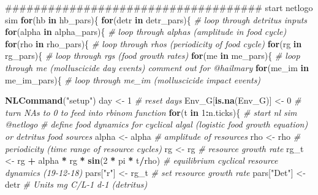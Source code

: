 \documentclass[10,portrait]{article}
\newenvironment{Shaded}{\begin{snugshade}}{\end{snugshade}}
\newcommand{\KeywordTok}[1]{\textcolor[rgb]{0.13,0.29,0.53}{\textbf{#1}}}
\newcommand{\DecValTok}[1]{\textcolor[rgb]{0.00,0.00,0.81}{#1}}
\newcommand{\StringTok}[1]{\textcolor[rgb]{0.31,0.60,0.02}{#1}}
\newcommand{\CommentTok}[1]{\textcolor[rgb]{0.56,0.35,0.01}{\textit{#1}}}
\newcommand{\ControlFlowTok}[1]{\textcolor[rgb]{0.13,0.29,0.53}{\textbf{#1}}}
\newcommand{\OperatorTok}[1]{\textcolor[rgb]{0.81,0.36,0.00}{\textbf{#1}}}
\newcommand{\NormalTok}[1]{#1}
\begin{document}
\begin{Shaded}
\begin{Highlighting}[]
{{{        
\NormalTok{####################################  start netlogo sim  }
        \ControlFlowTok{for}\NormalTok{(hb }\ControlFlowTok{in}\NormalTok{ hb_pars)\{}
          \ControlFlowTok{for}\NormalTok{(detr }\ControlFlowTok{in}\NormalTok{ detr_pars)\{ }\CommentTok{# loop through detritus inputs}
            \ControlFlowTok{for}\NormalTok{(alpha }\ControlFlowTok{in}\NormalTok{ alpha_pars)\{ }\CommentTok{# loop through alphas (amplitude in food cycle)}
              \ControlFlowTok{for}\NormalTok{(rho }\ControlFlowTok{in}\NormalTok{ rho_pars)\{ }\CommentTok{# loop through rhos (periodicity of food cycle)}
                \ControlFlowTok{for}\NormalTok{(rg }\ControlFlowTok{in}\NormalTok{ rg_pars)\{ }\CommentTok{# loop through rgs (food growth rates)}
                  \ControlFlowTok{for}\NormalTok{(me }\ControlFlowTok{in}\NormalTok{ me_pars)\{ }\CommentTok{# loop through me (molluscicide day events) comment out for @hailmary}
                  \ControlFlowTok{for}\NormalTok{(me_im }\ControlFlowTok{in}\NormalTok{ me_im_pars)\{ }\CommentTok{# loop through me_im (molluscicide impact events)}
                    
                    \KeywordTok{NLCommand}\NormalTok{(}\StringTok{"setup"}\NormalTok{)}
\NormalTok{                    day <-}\StringTok{ }\DecValTok{1} \CommentTok{# reset days }
\NormalTok{                    Env_G[}\KeywordTok{is.na}\NormalTok{(Env_G)] <-}\StringTok{ }\DecValTok{0} \CommentTok{# turn NAs to 0 to feed into rbinom function }
                    \ControlFlowTok{for}\NormalTok{(t }\ControlFlowTok{in} \DecValTok{1}\OperatorTok{:}\NormalTok{n.ticks)\{ }\CommentTok{# start nl sim  @netlogo}
                      \CommentTok{# define food dynamics for cyclical algal (logistic food growth equation) or detritus food sources}
\NormalTok{                      alpha <-}\StringTok{ }\NormalTok{alpha }\CommentTok{# amplitude of resources}
\NormalTok{                      rho <-}\StringTok{ }\NormalTok{rho  }\CommentTok{# periodicity (time range of resource cycles)  }
\NormalTok{                      rg <-}\StringTok{ }\NormalTok{rg }\CommentTok{# resource growth rate }
\NormalTok{                      rg_t <-}\StringTok{ }\NormalTok{rg }\OperatorTok{+}\StringTok{ }\NormalTok{alpha }\OperatorTok{*}\StringTok{ }\NormalTok{rg }\OperatorTok{*}\StringTok{ }\KeywordTok{sin}\NormalTok{(}\DecValTok{2} \OperatorTok{*}\StringTok{ }\NormalTok{pi }\OperatorTok{*}\StringTok{ }\NormalTok{t}\OperatorTok{/}\NormalTok{rho) }\CommentTok{# equilibrium cyclical resource dynamics (19-12-18)}
\NormalTok{                      pars[}\StringTok{"r"}\NormalTok{] <-}\StringTok{ }\NormalTok{rg_t }\CommentTok{# set resource growth rate }
\NormalTok{                      pars[}\StringTok{"Det"}\NormalTok{] <-}\StringTok{ }\NormalTok{detr }\CommentTok{# Units mg C/L-1 d-1 (detritus)}
                      
}}}
\end{Highlighting}
\end{Shaded}
\end{document}
